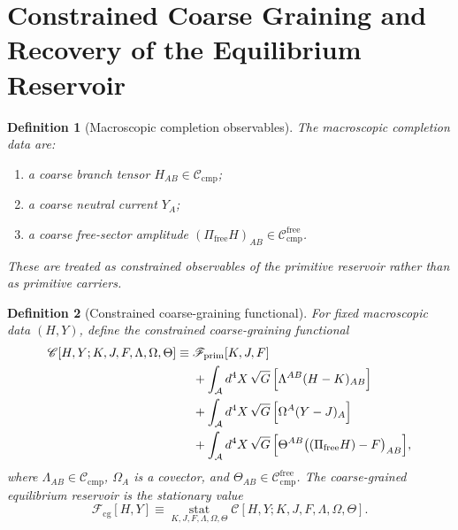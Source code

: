 \documentclass[11pt]{article}
\newcommand{\Sub}{\mathcal A}
\newcommand{\FreeProj}{\Pi_{\mathrm{free}}}
\newcommand{\GaugeAux}{Y}
\newcommand{\CompClass}{\mathscr C_{\mathrm{cmp}}}
\newcommand{\CompFree}{\mathscr C_{\mathrm{cmp}}^{\mathrm{free}}}
\newcommand{\PrimFunctional}{\mathscr F_{\mathrm{prim}}}
\newcommand{\CoarseFunctional}{\mathscr F_{\mathrm{cg}}}
\newcommand{\PrimStrain}{K}
\newcommand{\PrimNeutral}{J}
\newcommand{\PrimFree}{F}
\newcommand{\StrainMult}{\Lambda}
\newcommand{\NeutralMult}{\Omega}
\newcommand{\FreeMult}{\Theta}
\newtheorem{definition}{Definition}
\begin{document}
\section{Constrained Coarse Graining and Recovery of the Equilibrium Reservoir}

\begin{definition}[Macroscopic completion observables]
\label{def:macroscopic}
The macroscopic completion data are:
\begin{enumerate}
    \item a coarse branch tensor \(H_{AB}\in\CompClass\);
    \item a coarse neutral current \(\GaugeAux_A\);
    \item a coarse free-sector amplitude \((\FreeProj H)_{AB}\in\CompFree\).
\end{enumerate}
These are treated as constrained observables of the primitive reservoir rather than as primitive carriers.
\end{definition}

\begin{definition}[Constrained coarse-graining functional]
\label{def:cg}
For fixed macroscopic data \((H,\GaugeAux)\), define the constrained coarse-graining functional
\begin{equation}
\begin{aligned}
\mathscr C[H,\GaugeAux;\PrimStrain,\PrimNeutral,\PrimFree,\StrainMult,\NeutralMult,\FreeMult]
\equiv\;
&\PrimFunctional[\PrimStrain,\PrimNeutral,\PrimFree]
\\
&+\int_{\Sub} d^4X\,\sqrt{G}\,
\Bigl[
\StrainMult^{AB}(H-\PrimStrain)_{AB}
\Bigr]
\\
&+\int_{\Sub} d^4X\,\sqrt{G}\,
\Bigl[
\NeutralMult^A(\GaugeAux-\PrimNeutral)_A
\Bigr]
\\
&+\int_{\Sub} d^4X\,\sqrt{G}\,
\Bigl[
\FreeMult^{AB}\bigl((\FreeProj H)-\PrimFree\bigr)_{AB}
\Bigr],
\end{aligned}
\label{eq:C}
\end{equation}
where \(\StrainMult_{AB}\in\CompClass\), \(\NeutralMult_A\) is a covector, and \(\FreeMult_{AB}\in\CompFree\). The \emph{coarse-grained equilibrium reservoir} is the stationary value
\begin{equation}
\CoarseFunctional[H,\GaugeAux]
\equiv
\operatorname*{stat}_{\PrimStrain,\PrimNeutral,\PrimFree,\StrainMult,\NeutralMult,\FreeMult}
\mathscr C[H,\GaugeAux;\PrimStrain,\PrimNeutral,\PrimFree,\StrainMult,\NeutralMult,\FreeMult].
\label{eq:Fcg}
\end{equation}
\end{definition}
\end{document}

